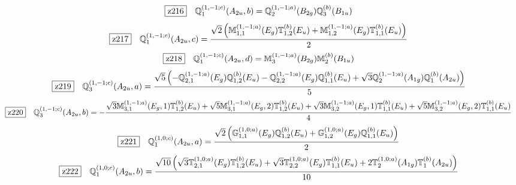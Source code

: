 \documentclass[fleqn,10pt,landscape]{jsarticle}
\begin{document}
\begin{dmath*}
\hspace*{3mm}\fbox{z216}\quad \mathbb{Q}_{1}^{(1,-1;c)}(A_{2u},b)=\mathbb{Q}_{2}^{(1,-1;a)}(B_{2g}) \mathbb{Q}_{3}^{(b)}(B_{1u})
\end{dmath*}
\begin{dmath*}
\hspace*{3mm}\fbox{z217}\quad \mathbb{Q}_{1}^{(1,-1;c)}(A_{2u},c)=\frac{\sqrt{2} \left(\mathbb{M}_{1,1}^{(1,-1;a)}(E_{g}) \mathbb{T}_{1,2}^{(b)}(E_{u}) + \mathbb{M}_{1,2}^{(1,-1;a)}(E_{g}) \mathbb{T}_{1,1}^{(b)}(E_{u})\right)}{2}
\end{dmath*}
\begin{dmath*}
\hspace*{3mm}\fbox{z218}\quad \mathbb{Q}_{1}^{(1,-1;c)}(A_{2u},d)=\mathbb{M}_{3}^{(1,-1;a)}(B_{2g}) \mathbb{M}_{2}^{(b)}(B_{1u})
\end{dmath*}
\begin{dmath*}
\hspace*{3mm}\fbox{z219}\quad \mathbb{Q}_{3}^{(1,-1;c)}(A_{2u},a)=\frac{\sqrt{5} \left(- \mathbb{Q}_{2,1}^{(1,-1;a)}(E_{g}) \mathbb{Q}_{1,2}^{(b)}(E_{u}) - \mathbb{Q}_{2,2}^{(1,-1;a)}(E_{g}) \mathbb{Q}_{1,1}^{(b)}(E_{u}) + \sqrt{3} \mathbb{Q}_{2}^{(1,-1;a)}(A_{1g}) \mathbb{Q}_{1}^{(b)}(A_{2u})\right)}{5}
\end{dmath*}
\begin{dmath*}
\hspace*{3mm}\fbox{z220}\quad \mathbb{Q}_{3}^{(1,-1;c)}(A_{2u},b)=- \frac{\sqrt{3} \mathbb{M}_{3,1}^{(1,-1;a)}(E_{g},1) \mathbb{T}_{1,2}^{(b)}(E_{u}) + \sqrt{5} \mathbb{M}_{3,1}^{(1,-1;a)}(E_{g},2) \mathbb{T}_{1,2}^{(b)}(E_{u}) + \sqrt{3} \mathbb{M}_{3,2}^{(1,-1;a)}(E_{g},1) \mathbb{T}_{1,1}^{(b)}(E_{u}) + \sqrt{5} \mathbb{M}_{3,2}^{(1,-1;a)}(E_{g},2) \mathbb{T}_{1,1}^{(b)}(E_{u})}{4}
\end{dmath*}
\begin{dmath*}
\hspace*{3mm}\fbox{z221}\quad \mathbb{Q}_{1}^{(1,0;c)}(A_{2u},a)=\frac{\sqrt{2} \left(\mathbb{G}_{1,1}^{(1,0;a)}(E_{g}) \mathbb{Q}_{1,2}^{(b)}(E_{u}) + \mathbb{G}_{1,2}^{(1,0;a)}(E_{g}) \mathbb{Q}_{1,1}^{(b)}(E_{u})\right)}{2}
\end{dmath*}
\begin{dmath*}
\hspace*{3mm}\fbox{z222}\quad \mathbb{Q}_{1}^{(1,0;c)}(A_{2u},b)=\frac{\sqrt{10} \left(\sqrt{3} \mathbb{T}_{2,1}^{(1,0;a)}(E_{g}) \mathbb{T}_{1,2}^{(b)}(E_{u}) + \sqrt{3} \mathbb{T}_{2,2}^{(1,0;a)}(E_{g}) \mathbb{T}_{1,1}^{(b)}(E_{u}) + 2 \mathbb{T}_{2}^{(1,0;a)}(A_{1g}) \mathbb{T}_{1}^{(b)}(A_{2u})\right)}{10}
\end{dmath*}
\end{document}
